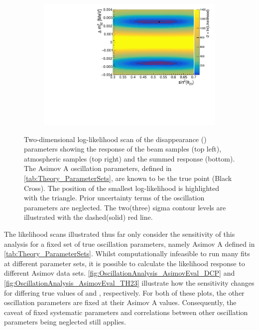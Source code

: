 \begin{figure}[h]
\begin{subfigure}[t]{1.0\textwidth}
    \includegraphics[width=\textwidth, trim={0mm 0mm 0mm 0mm}, clip,page=3]{Figures/OA/DisappearanceScans.pdf}
  \end{subfigure}
  \caption{Two-dimensional log-likelihood scan of the disappearance (\textendash{}) parameters showing the response of the beam samples (top left), atmospheric samples (top right) and the summed response (bottom). The Asimov A oscillation parameters, defined in \autoref{tab:Theory_ParameterSets}, are known to be the true point (Black Cross). The position of the smallest log-likelihood is highlighted with the triangle. Prior uncertainty terms of the oscillation parameters are neglected. The two(three) sigma contour levels are illustrated with the dashed(solid) red line.}
  \label{fig:OscillationAnalysis_2DLLHOscScans_Dis}
\end{figure}

\clearpage

The likelihood scans illustrated thus far only consider the sensitivity of this analysis for a fixed set of true oscillation parameters, namely Asimov A defined in \autoref{tab:Theory_ParameterSets}. Whilst computationally infeasible to run many fits at different parameter sets, it is possible to calculate the likelihood response to different Asimov data sets. \autoref{fig:OscillationAnalysis_AsimovEval_DCP} and \autoref{fig:OscillationAnalysis_AsimovEval_TH23} illustrate how the sensitivity changes for differing true values of  and , respectively. For both of these plots, the other oscillation parameters are fixed at their Asimov A values. Consequently, the caveat of fixed systematic parameters and correlations between other oscillation parameters being neglected still applies.

